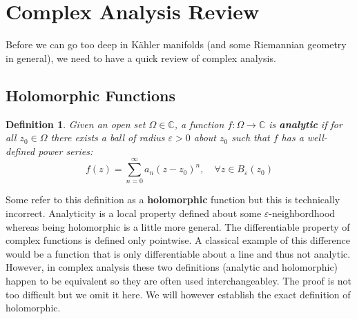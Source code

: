 \documentclass[12pt, letterpaper]{article}
\newtheorem{definition}{Definition}[section]
\newcommand{\C}{\mathbb{C}}
\newcommand{\ten}[1]{\textnormal{\textbf{#1}}}
\begin{document}
\section{Complex Analysis Review}
Before we can go too deep in Kähler manifolds (and some Riemannian geometry in
general), we need to have a quick review of complex analysis.

\subsection{Holomorphic Functions}

\begin{definition}\label{def 3.1}
    Given an open set $\Omega \in \C$, a function $f: \Omega \to \C$ is \ten{analytic}
    if for all $z_0 \in \Omega$ there exists a ball of radius $\varepsilon>0$ about
    $z_0$ such that $f$ has a well-defined power series:
    \begin{equation*}
        f(z) = \sum_{n=0}^\infty a_n (z-z_0)^n, \quad \forall z \in B_\varepsilon
        (z_0)
    \end{equation*}
\end{definition}

Some refer to this definition as a \textbf{holomorphic} function but this is technically
incorrect. Analyticity is a local property defined about some $\varepsilon$-neighbordhood
whereas being holomorphic is a little more general. The differentiable property of
complex functions is defined only pointwise. A classical example of this difference
would be a function that is only differentiable about a line and thus not analytic. 
However, in complex analysis these two definitions (analytic and holomorphic) happen
to be equivalent so they are often used interchangeabley. The proof is not too difficult
but we omit it here. We will however establish the exact definition of holomorphic.
\end{document}
